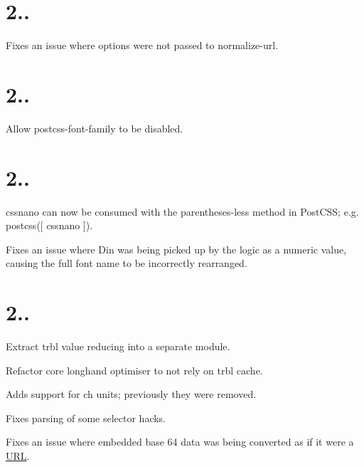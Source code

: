 \section*{2..}


\begin{DoxyItemize}
\item Fixes an issue where options were not passed to normalize-\/url.
\end{DoxyItemize}

\section*{2..}


\begin{DoxyItemize}
\item Allow {\ttfamily postcss-\/font-\/family} to be disabled.
\end{DoxyItemize}

\section*{2..}


\begin{DoxyItemize}
\item cssnano can now be consumed with the parentheses-\/less method in Post\+C\+SS; e.\+g. {\ttfamily postcss(\mbox{[} cssnano \mbox{]})}.
\item Fixes an issue where \textquotesingle{}Din\textquotesingle{} was being picked up by the logic as a numeric value, causing the full font name to be incorrectly rearranged.
\end{DoxyItemize}

\section*{2..}


\begin{DoxyItemize}
\item Extract trbl value reducing into a separate module.
\item Refactor core longhand optimiser to not rely on trbl cache.
\item Adds support for {\ttfamily ch} units; previously they were removed.
\item Fixes parsing of some selector hacks.
\item Fixes an issue where embedded base 64 data was being converted as if it were a \mbox{\hyperlink{namespace_u_r_l}{U\+RL}}.
\end{DoxyItemize}

